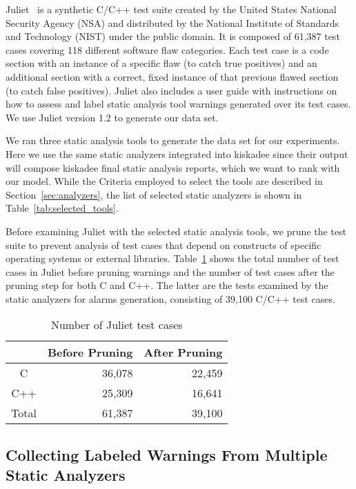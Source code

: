 Juliet~\cite{juliet} is a synthetic C/C++ test suite created by the United
States National Security Agency (NSA) and distributed by the National Institute
of Standards and Technology (NIST) under the public domain. It is composed of 61,387 test cases
covering 118 different software flaw categories. Each test case is a code
section with an instance of a specific flaw (to catch true positives) and an
additional section with a correct, fixed instance of that previous flawed section (to
catch false positives).  Juliet also includes a user guide with instructions
on how to assess and label static analysis tool warnings generated over its
test cases. We use Juliet version 1.2 to generate our data set.

We ran three static analysis tools to generate the data set for our
experiments. Here we use the same static analyzers integrated into
kiskadee since their output will compose kiskadee final
static analysis reports, which we want to rank with our model.
While the Criteria employed to select the tools are described
in Section~\ref{sec:analyzers}, the list of selected static
analyzers is shown in Table~\ref{tab:selected_tools}.

Before examining Juliet with the selected static analysis tools, we prune the
test suite to prevent analysis of test cases that depend on constructs of
specific operating systems or external libraries.
Table~\ref{tab:juliet_numbers} shows the total number of test cases in Juliet
before pruning warnings and the number of test cases after the pruning step for
both C and C++. The latter are the tests examined by the static analyzers for
alarms generation, consisting of 39,100 C/C++ test cases.

  \begin{table}
    \begin{center}
        \begin{tabular}{crr}\hline
          & Before Pruning & After Pruning \\
        \hline
          C & 36,078 & 22,459 \\
          C++ & 25,309 & 16,641 \\
          Total & 61,387 & 39,100 \\ \hline
        \end{tabular}
        \caption{Number of Juliet test cases}\label{tab:juliet_numbers}
    \end{center}
\end{table}

\subsection{Collecting Labeled Warnings From Multiple Static Analyzers}\label{sec:data:labels}

